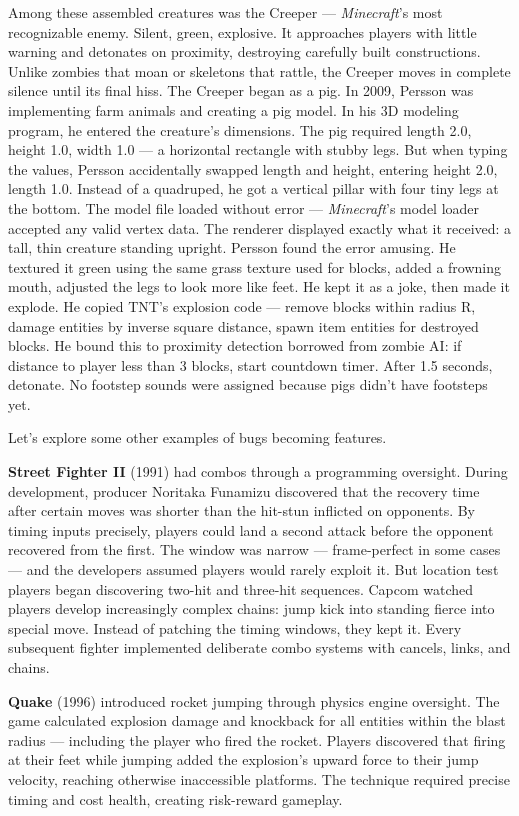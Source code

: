 Among these assembled creatures was the Creeper — \emph{Minecraft}'s most recognizable enemy. Silent, green, explosive. It approaches players with little warning and detonates on proximity, destroying carefully built constructions. Unlike zombies that moan or skeletons that rattle, the Creeper moves in complete silence until its final hiss. The Creeper began as a pig. In 2009, Persson was implementing farm animals and creating a pig model. In his 3D modeling program, he entered the creature's dimensions. The pig required length 2.0, height 1.0, width 1.0 — a horizontal rectangle with stubby legs. But when typing the values, Persson accidentally swapped length and height, entering height 2.0, length 1.0. Instead of a quadruped, he got a vertical pillar with four tiny legs at the bottom. The model file loaded without error — \emph{Minecraft}'s model loader accepted any valid vertex data. The renderer displayed exactly what it received: a tall, thin creature standing upright. Persson found the error amusing. He textured it green using the same grass texture used for blocks, added a frowning mouth, adjusted the legs to look more like feet. He kept it as a joke, then made it explode. He copied TNT's explosion code — remove blocks within radius R, damage entities by inverse square distance, spawn item entities for destroyed blocks. He bound this to proximity detection borrowed from zombie AI: if distance to player less than 3 blocks, start countdown timer. After 1.5 seconds, detonate. No footstep sounds were assigned because pigs didn't have footsteps yet.

Let's explore some other examples of bugs becoming features.

\textbf{Street Fighter II} (1991) had combos through a programming oversight. During development, producer Noritaka Funamizu discovered that the recovery time after certain moves was shorter than the hit-stun inflicted on opponents. By timing inputs precisely, players could land a second attack before the opponent recovered from the first. The window was narrow — frame-perfect in some cases — and the developers assumed players would rarely exploit it. But location test players began discovering two-hit and three-hit sequences. Capcom watched players develop increasingly complex chains: jump kick into standing fierce into special move. Instead of patching the timing windows, they kept it.  Every subsequent fighter implemented deliberate combo systems with cancels, links, and chains.

\textbf{Quake} (1996) introduced rocket jumping through physics engine oversight. The game calculated explosion damage and knockback for all entities within the blast radius — including the player who fired the rocket. Players discovered that firing at their feet while jumping added the explosion's upward force to their jump velocity, reaching otherwise inaccessible platforms. The technique required precise timing and cost health, creating risk-reward gameplay.


